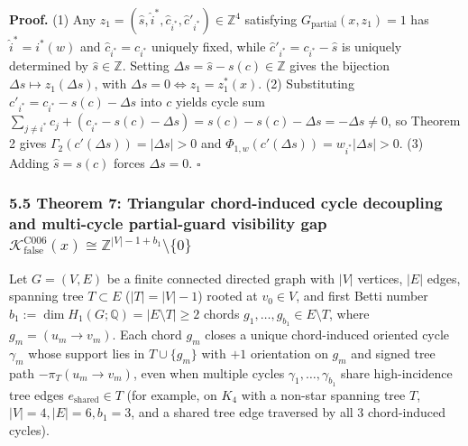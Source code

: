 \documentclass[
  11pt,
]{article}
\begin{document}
\textbf{Proof.} (1) Any
\(z_1 = (\hat{s},\allowbreak  \hat{i}^*,\allowbreak  \hat{c}_{i^*},\allowbreak  \hat{c}'_{i^*}) \in \mathbb{Z}^4\)
satisfying \(G_{\text{partial}}(x,\allowbreak  z_1) = 1\) has
\(\hat{i}^* = i^*(w)\) and \(\hat{c}_{i^*} = c_{i^*}\) uniquely fixed,
while \(\hat{c}'_{i^*} = c_{i^*} - \hat{s}\) is uniquely determined by
\(\hat{s} \in \mathbb{Z}\). Setting
\(\Delta s = \hat{s} - s(c) \in \mathbb{Z}\) gives the bijection
\(\Delta s \mapsto z_1(\Delta s)\), with
\(\Delta s = 0 \iff z_1 = z_1^*(x)\). (2) Substituting
\(c'_{i^*} = c_{i^*} - s(c) - \Delta s\) into \(c\) yields cycle sum
\(\sum_{j \ne i^*} c_j + (c_{i^*} - s(c) - \Delta s) = s(c) - s(c) - \Delta s = -\Delta s \ne 0\),
so Theorem 2 gives \(\Gamma_2(c'(\Delta s)) = |\Delta s| > 0\) and
\(\Phi_{1,\allowbreak w}(c'(\Delta s)) = w_{i^*}|\Delta s| > 0\). (3)
Adding \(\hat{s} = s(c)\) forces \(\Delta s = 0\). \(\square\)

\subsubsection{\texorpdfstring{5.5 Theorem 7: Triangular chord-induced
cycle decoupling and multi-cycle partial-guard visibility gap
\(\mathcal{K}_{\text{false}}^{\text{C006}}(x) \cong \mathbb{Z}^{|V|-1+b_1} \setminus \{0\}\)}{5.5 Theorem 7: Triangular chord-induced cycle decoupling and multi-cycle partial-guard visibility gap \textbackslash mathcal\{K\}\_\{\textbackslash text\{false\}\}\^{}\{\textbackslash text\{C006\}\}(x) \textbackslash cong \textbackslash mathbb\{Z\}\^{}\{\textbar V+b\_1\} \textbackslash setminus \textbackslash\{0\textbackslash\}}}\label{theorem-7-triangular-chord-induced-cycle-decoupling-and-multi-cycle-partial-guard-visibility-gap-mathcalk_textfalsetextc006x-cong-mathbbzv-1b_1-setminus-0}

Let \(G = (V,\allowbreak  E)\) be a finite connected directed graph with
\(|V|\) vertices, \(|E|\) edges, spanning tree \(T \subset E\)
(\(|T| = |V| - 1\)) rooted at \(v_0 \in V\), and first Betti number
\(b_1 := \dim H_1(G; \mathbb{Q}) = |E \setminus T| \ge 2\) chords
\(g_1,\allowbreak  \dots,\allowbreak  g_{b_1} \in E \setminus T\), where
\(g_m = (u_m \to v_m)\). Each chord \(g_m\) closes a unique
chord-induced oriented cycle \(\gamma_m\) whose support lies in
\(T \cup \{g_m\}\) with \(+1\) orientation on \(g_m\) and signed tree
path \(-\pi_T(u_m \to v_m)\), even when multiple cycles
\(\gamma_1,\allowbreak  \dots,\allowbreak  \gamma_{b_1}\) share
high-incidence tree edges \(e_{\text{shared}} \in T\) (for example, on
\(K_4\) with a non-star spanning tree \(T\),
\(|V|=4,\allowbreak  |E|=6,\allowbreak  b_1=3\), and a shared tree edge
traversed by all \(3\) chord-induced cycles).
\end{document}
